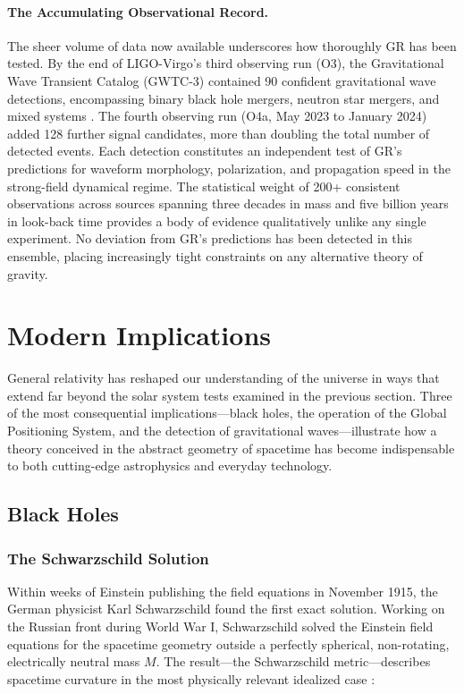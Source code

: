 \documentclass[12pt, a4paper]{article}
\begin{document}
	\paragraph{The Accumulating Observational Record.}
	The sheer volume of data now available underscores how thoroughly GR has been tested. By the end of LIGO-Virgo's third observing run (O3), the Gravitational Wave Transient Catalog (GWTC-3) contained 90 confident gravitational wave detections, encompassing binary black hole mergers, neutron star mergers, and mixed systems \citep{willConfrontationGeneralRelativity2014}. The fourth observing run (O4a, May 2023 to January 2024) added 128 further signal candidates, more than doubling the total number of detected events. Each detection constitutes an independent test of GR's predictions for waveform morphology, polarization, and propagation speed in the strong-field dynamical regime. The statistical weight of 200+ consistent observations across sources spanning three decades in mass and five billion years in look-back time provides a body of evidence qualitatively unlike any single experiment. No deviation from GR's predictions has been detected in this ensemble, placing increasingly tight constraints on any alternative theory of gravity.
	
	\section{Modern Implications}
	
	General relativity has reshaped our understanding of the universe in ways that extend far beyond the solar system tests examined in the previous section. Three of the most consequential implications—black holes, the operation of the Global Positioning System, and the detection of gravitational waves—illustrate how a theory conceived in the abstract geometry of spacetime has become indispensable to both cutting-edge astrophysics and everyday technology.
	
	\subsection{Black Holes}
	
	\subsubsection{The Schwarzschild Solution}
	
	Within weeks of Einstein publishing the field equations in November 1915, the German physicist Karl Schwarzschild found the first exact solution. Working on the Russian front during World War I, Schwarzschild solved the Einstein field equations for the spacetime geometry outside a perfectly spherical, non-rotating, electrically neutral mass \(M\). The result—the Schwarzschild metric—describes spacetime curvature in the most physically relevant idealized case \citep{carrollSpacetimeGeometryIntroduction2019}:
	
\end{document}
